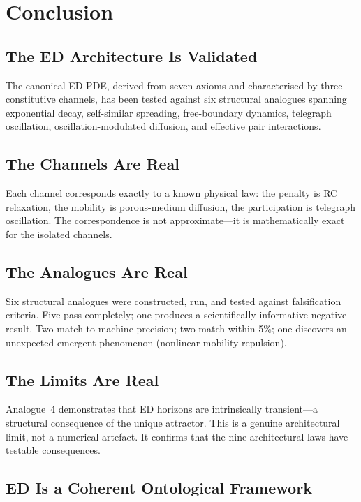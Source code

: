 \documentclass[11pt]{article}
\begin{document}
\section{Conclusion}

\subsection{The ED Architecture Is Validated}

The canonical ED PDE, derived from seven axioms and characterised by three constitutive channels, has been tested against six structural analogues spanning exponential decay, self-similar spreading, free-boundary dynamics, telegraph oscillation, oscillation-modulated diffusion, and effective pair interactions.

\subsection{The Channels Are Real}

Each channel corresponds exactly to a known physical law: the penalty is RC relaxation, the mobility is porous-medium diffusion, the participation is telegraph oscillation. The correspondence is not approximate---it is mathematically exact for the isolated channels.

\subsection{The Analogues Are Real}

Six structural analogues were constructed, run, and tested against falsification criteria. Five pass completely; one produces a scientifically informative negative result. Two match to machine precision; two match within 5\%; one discovers an unexpected emergent phenomenon (nonlinear-mobility repulsion).

\subsection{The Limits Are Real}

Analogue~4 demonstrates that ED horizons are intrinsically transient---a structural consequence of the unique attractor. This is a genuine architectural limit, not a numerical artefact. It confirms that the nine architectural laws have testable consequences.

\subsection{ED Is a Coherent Ontological Framework}
\end{document}
